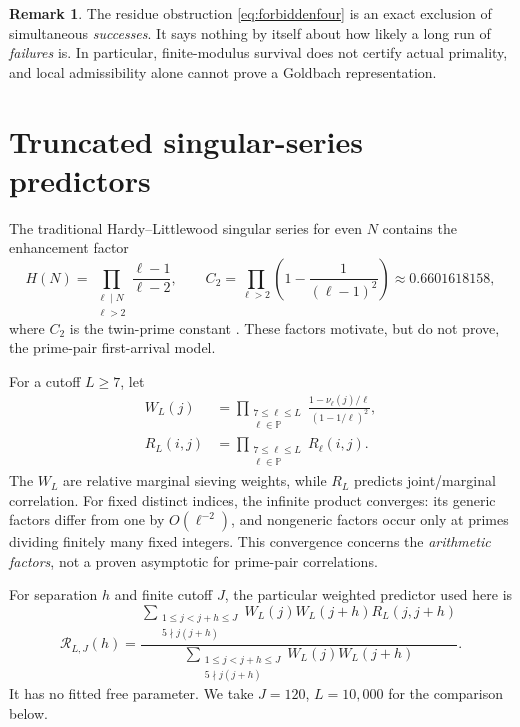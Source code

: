 \documentclass[11pt,a4paper]{article}
\theoremstyle{definition}
\newtheorem{remark}[theorem]{Remark}
\newcommand{\PP}{\mathbb P}
\begin{document}
\begin{remark}
The residue obstruction \eqref{eq:forbiddenfour} is an exact exclusion of simultaneous \emph{successes}.  It says nothing by itself about how likely a long run of \emph{failures} is.  In particular, finite-modulus survival does not certify actual primality, and local admissibility alone cannot prove a Goldbach representation.
\end{remark}

\section{Truncated singular-series predictors}
The traditional Hardy--Littlewood singular series for even $N$ contains the enhancement factor
\begin{equation}\label{eq:H}
 H(N)=\prod_{\substack{\ell\mid N\\\ell>2}}\frac{\ell-1}{\ell-2},
 \qquad C_2=\prod_{\ell>2}\left(1-\frac1{(\ell-1)^2}\right)
 \approx0.6601618158,
\end{equation}
where $C_2$ is the twin-prime constant \cite{HardyLittlewood1923,GoldstonHuntsNgotiaoco2017}.  These factors motivate, but do not prove, the prime-pair first-arrival model.

For a cutoff $L\ge7$, let
\begin{align}
 W_L(j)&=\prod_{\substack{7\le\ell\le L\\\ell\in\PP}}
 \frac{1-\nu_\ell(j)/\ell}{(1-1/\ell)^2}, \label{eq:weight}\\
 R_L(i,j)&=\prod_{\substack{7\le\ell\le L\\\ell\in\PP}}R_\ell(i,j).\label{eq:prodR}
\end{align}
The $W_L$ are relative marginal sieving weights, while $R_L$ predicts joint/marginal correlation. For fixed distinct indices, the infinite product converges: its generic factors differ from one by $O(\ell^{-2})$, and nongeneric factors occur only at primes dividing finitely many fixed integers. This convergence concerns the \emph{arithmetic factors}, not a proven asymptotic for prime-pair correlations.

For separation $h$ and finite cutoff $J$, the particular weighted predictor used here is
\begin{equation}\label{eq:weighted}
 \mathcal R_{L,J}(h)=
 \frac{\displaystyle\sum_{\substack{1\le j<j+h\le J\\5\nmid j(j+h)}}
 W_L(j)W_L(j+h)R_L(j,j+h)}
 {\displaystyle\sum_{\substack{1\le j<j+h\le J\\5\nmid j(j+h)}}
 W_L(j)W_L(j+h)}.
\end{equation}
It has no fitted free parameter. We take $J=120$, $L=10{,}000$ for the comparison below.
\end{document}
